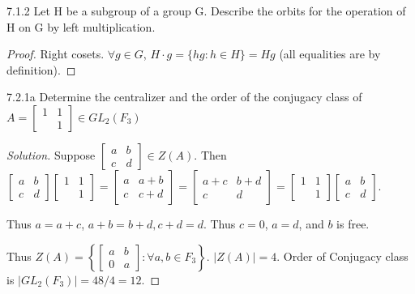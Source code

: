 \documentclass{article}
\newenvironment{solution}
{\renewcommand\qedsymbol{$\blacksquare$}\begin{proof}[Solution]}
{\end{proof}}
\begin{document}
\bigskip

\begin{PROB}{7.1.2}\label{Problem 7.1.2.}
    Let H be a subgroup of a group G. Describe the orbits for the operation of H on G by left multiplication.
\end{PROB}
\begin{proof}
    Right cosets. $\forall g \in G$, $H \cdot g = \{hg : h \in H\} = Hg$ (all equalities are by definition).
\end{proof}

\bigskip

\begin{PROB}{7.2.1a}\label{Problem 7.2.1a.}
    Determine the centralizer and the order of the conjugacy class of
    $A = \begin{bmatrix}
        1 & 1 \\ & 1
    \end{bmatrix} \in GL_2(F_3)$
\end{PROB}
\begin{solution}
    Suppose $\begin{bmatrix}
        a & b \\ c & d
    \end{bmatrix} \in Z(A)$. Then $\begin{bmatrix}
        a & b \\ c & d
    \end{bmatrix}\begin{bmatrix}
        1 & 1 \\ & 1
    \end{bmatrix} = \begin{bmatrix}
        a & a + b \\ c & c+d
    \end{bmatrix} = \begin{bmatrix}
        a + c & b + d \\ c & d
    \end{bmatrix} = \begin{bmatrix}
        1 & 1 \\  & 1
    \end{bmatrix}\begin{bmatrix}
        a & b \\ c & d
    \end{bmatrix}$.

    Thus $a = a + c$, $a + b = b + d, c + d = d$. Thus $c = 0$, $a = d$, and $b$ is free.

    Thus $ Z(A) = \left\{ \begin{bmatrix}
        a & b \\ 0 & a
    \end{bmatrix} : \forall a, b \in F_3 \right\}$. $|Z(A)| = 4$. Order of Conjugacy class is $|GL_2(F_3)| = 48/4 = 12$.
\end{solution}
\end{document}

